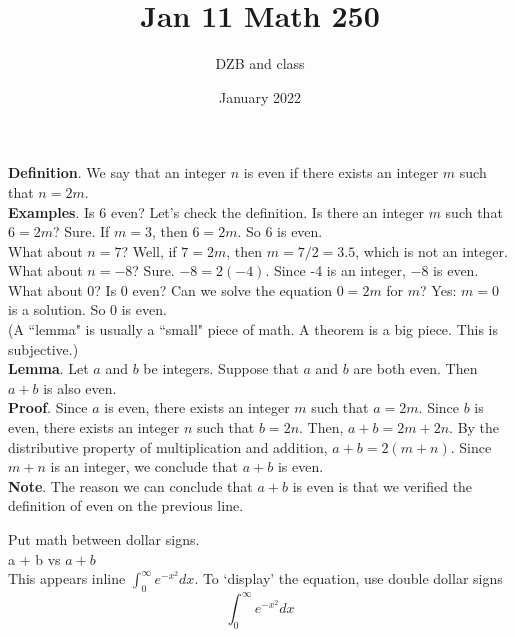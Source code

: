 \documentclass{article}
\title{Jan 11 Math 250}
\author{DZB and class}
\date{January 2022}
\begin{document}
\maketitle

\textbf{Definition}. We say that an integer $n$ is even if there exists an integer $m$ such that $n = 2m$. 
\\ %

\textbf{Examples}. Is 6 even? Let's check the definition.  Is there an integer $m$ such that $6 = 2m$? Sure. If $m = 3$, then $6 = 2m$. So 6 is even.
\\

What about $n = 7$? Well, if $7 = 2m$, then $m = 7/2 = 3.5$, which is not an integer. 
\\

What about $n = -8$? Sure. $-8 = 2(-4)$. Since -4 is an integer, $-8$ is even.
\\

What about 0? Is 0 even? Can we solve the equation $0 = 2m$ for $m$? Yes: $m = 0$ is a solution. So 0 is even.
\\

(A ``lemma" is usually a ``small" piece of math. A theorem is a big piece. This is subjective.)\\

\textbf{Lemma}. Let $a$ and $b$ be integers. Suppose that $a$ and $b$ are both even. Then $a + b$ is also even. 
\\

\textbf{Proof}. Since $a$ is even, there exists an integer $m$ such that $a = 2m$. Since $b$ is even, there exists an integer $n$ such that $b = 2n$. Then, $a + b = 2m + 2n$. By the distributive property of multiplication and addition, $a + b = 2(m+n)$. Since $m + n$ is an integer, we conclude that $a + b$ is even.
\\

\textbf{Note}. The reason we can conclude that $a + b$ is even is that we verified the definition of even on the previous line.
\\

\newpage

Put math between dollar signs.
\\

a + b vs $a + b$
\\

This appears inline $\int_0^{\infty} e^{-x^2} dx$. To `display' the equation, use double dollar signs
$$\int_0^{\infty} e^{-x^2} dx$$
\end{document}
